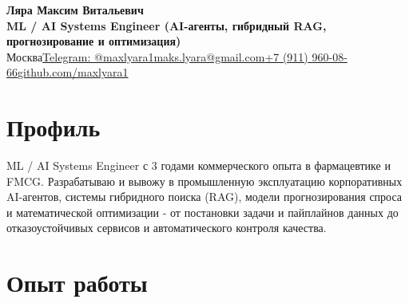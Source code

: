 \documentclass[a4paper,10pt]{article}
\newcommand{\sep}{\hspace{0.45em}\textbar\hspace{0.45em}}
\newcommand{\bodyfont}{\fontsize{9.4pt}{11.4pt}\selectfont}
\begin{document}
\bodyfont

\begin{center}
  {\fontsize{17.4pt}{20.2pt}\selectfont\textbf{Ляра Максим Витальевич}}\\[2.8pt]
  {\fontsize{10.1pt}{12.1pt}\selectfont\textbf{\color{accent}ML / AI Systems Engineer (AI-агенты, гибридный RAG, прогнозирование и оптимизация)}}\\[3.4pt]
  {\fontsize{9.3pt}{11.2pt}\selectfont
    Москва\sep\href{https://t.me/maxlyara1}{Telegram: @maxlyara1}\sep\href{mailto:maks.lyara@gmail.com}{maks.lyara@gmail.com}\sep\href{tel:+79119600866}{+7 (911) 960-08-66}\sep\href{https://github.com/maxlyara1}{github.com/maxlyara1}
  }
\end{center}
\vspace{-2.6pt}

\section{Профиль}
ML / AI Systems Engineer с 3 годами коммерческого опыта в фармацевтике и FMCG. Разрабатываю и вывожу в промышленную эксплуатацию корпоративных AI-агентов, системы гибридного поиска (RAG), модели прогнозирования спроса и математической оптимизации - от постановки задачи и пайплайнов данных до отказоустойчивых сервисов и автоматического контроля качества.

\section{Опыт работы}
\end{document}
